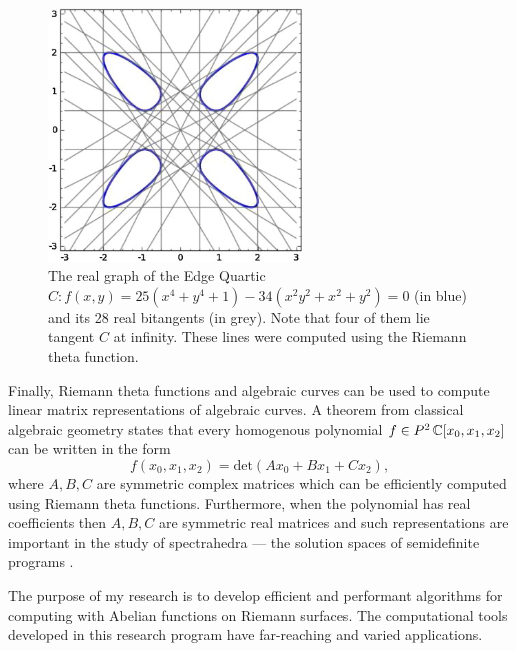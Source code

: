 \begin{figure}[t]
  \centering
  \includegraphics[width=0.6\textwidth]{images/bitangents.jpg}
  \caption{The real graph of the Edge Quartic $C: f(x,y) = 25(x^4+y^4+1)
    - 34(x^2y^2+x^2+y^2) = 0$ (in blue) and its 28 real bitangents (in
    grey). Note that four of them lie tangent $C$ at infinity. These
    lines were computed using the Riemann theta function.}
  \label{fig: edge}
\end{figure}

Finally, Riemann theta functions and algebraic curves can be used to
compute linear matrix representations of algebraic curves. A theorem
from classical algebraic geometry states that every homogenous
polynomial $f \in P^2\operatorname{\mathbb{C}}[x_0,x_1,x_2]$ can be written in the form
\[
   f(x_0,x_1,x_2) = \text{det}
   \left( A x_0 + B x_1 + C x_2 \right),
\]
where $A,B,C$ are symmetric complex matrices which can be efficiently
computed using Riemann theta functions. Furthermore, when the polynomial
has real coefficients then $A,B,C$ are symmetric real matrices and such
representations are important in the study of spectrahedra --- the
solution spaces of semidefinite programs \cite{PSV10}.

The purpose of my research is to develop efficient and performant
algorithms for computing with Abelian functions on Riemann surfaces. The
computational tools developed in this research program have far-reaching
and varied applications.

